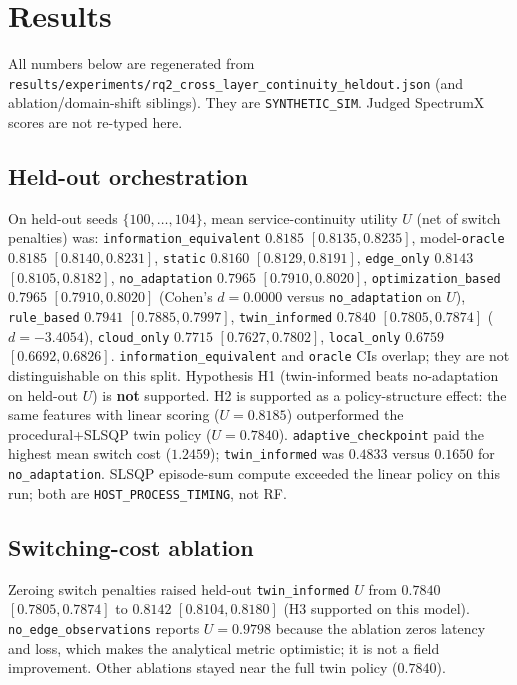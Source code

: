 \section{Results}
All numbers below are regenerated from \texttt{results/experiments/rq2\_cross\_layer\_continuity\_heldout.json} (and ablation/domain-shift siblings).
They are \texttt{SYNTHETIC\_SIM}. Judged SpectrumX scores are not re-typed here.

\subsection{Held-out orchestration}


On held-out seeds $\{100,\ldots,104\}$, mean service-continuity utility $U$ (net of switch penalties) was:
\texttt{information\_equivalent} $0.8185$ $[0.8135,0.8235]$,
model-\texttt{oracle} $0.8185$ $[0.8140,0.8231]$,
\texttt{static} $0.8160$ $[0.8129,0.8191]$,
\texttt{edge\_only} $0.8143$ $[0.8105,0.8182]$,
\texttt{no\_adaptation} $0.7965$ $[0.7910,0.8020]$,
\texttt{optimization\_based} $0.7965$ $[0.7910,0.8020]$ (Cohen's $d=0.0000$ versus \texttt{no\_adaptation} on $U$),
\texttt{rule\_based} $0.7941$ $[0.7885,0.7997]$,
\texttt{twin\_informed} $0.7840$ $[0.7805,0.7874]$ ($d=-3.4054$),
\texttt{cloud\_only} $0.7715$ $[0.7627,0.7802]$,
\texttt{local\_only} $0.6759$ $[0.6692,0.6826]$.
\texttt{information\_equivalent} and \texttt{oracle} CIs overlap; they are not distinguishable on this split.
Hypothesis H1 (twin-informed beats no-adaptation on held-out $U$) is \textbf{not} supported.
H2 is supported as a policy-structure effect: the same features with linear scoring ($U=0.8185$) outperformed the procedural+SLSQP twin policy ($U=0.7840$).
\texttt{adaptive\_checkpoint} paid the highest mean switch cost ($1.2459$); \texttt{twin\_informed} was $0.4833$ versus $0.1650$ for \texttt{no\_adaptation}.
SLSQP episode-sum compute exceeded the linear policy on this run; both are \texttt{HOST\_PROCESS\_TIMING}, not RF.

\subsection{Switching-cost ablation}


Zeroing switch penalties raised held-out \texttt{twin\_informed} $U$ from $0.7840$ $[0.7805,0.7874]$ to $0.8142$ $[0.8104,0.8180]$ (H3 supported on this model).
\texttt{no\_edge\_observations} reports $U=0.9798$ because the ablation zeros latency and loss, which makes the analytical metric optimistic; it is not a field improvement.
Other ablations stayed near the full twin policy ($0.7840$).

